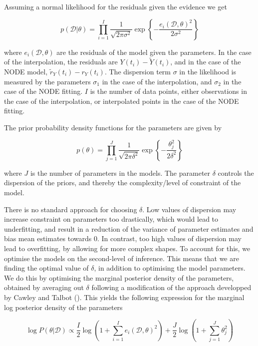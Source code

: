 \documentclass[11pt, oneside]{article}
\begin{document}
Assuming a normal likelihood for the residuals given the evidence we get

\begin{equation}
	p( \mathcal{D} | \theta) = \prod_{i=1}^{I} \frac{1}{\sqrt{2\pi\sigma^2}}  \exp \left\{ -\frac{e_i(\mathcal{D},\theta)^2}{2\sigma^2}  \right\}
\end{equation}

where $e_i(\mathcal{D},\theta)$ are the residuals of the model given the parameters. 
In the case of the interpolation, the residuals are $Y(t_i)-\tilde{Y}(t_i)$, and in the case of the NODE model, $\tilde{r}_{Y}(t_i) - r_{Y}(t_i)$.
The dispersion term $\sigma$ in the likelihood is measured by the parameters $\sigma_1$ in the case of the interpolation, and $\sigma_2$ in the case of the NODE fitting.
$I$ is the number of data points, either observations in the case of the interpolation, or interpolated points in the case of the NODE fitting.

The prior probability density functions for the parameters are given by

\begin{equation}
	p(\theta) = \prod_{j=1}^{J} \frac{1}{\sqrt{2\pi\delta^2}}  \exp \left\{ -\frac{\theta_j^2}{2\delta^2}  \right\}
\end{equation}

where $J$ is the number of parameters in the models.
The parameter $\delta$ controls the dispersion of the priors, and thereby the complexity/level of constraint of the model.

There is no standard approach for choosing $\delta$.
Low values of dispersion may increase constraint on parameters too drastically, which would lead to underfitting, and result in a reduction of the variance of parameter estimates and bias mean estimates towards 0.
In contrast, too high values of dispersion may lead to overfitting, by allowing for more complex shapes.
To account for this, we optimise the models on the second-level of inference.
This means that we are finding the optimal value of $\delta$, in addition to optimising the model parameters. 
We do this by optimising the marginal posterior density of the parameters, obtained by averaging out $\delta$ following a modification of the approach developped by Cawley and Talbot (\cite{Cawley2007}). 
This yields the following expression for the marginal log posterior density of the parameters 

\begin{equation}
	\log P(\theta | \mathcal{D}) \propto \frac{I}{2} \log \left(1 + \sum_{i=1}^{I} e_i(\mathcal{D},\theta)^2\right) + \frac{J}{2} \log \left(1 + \sum_{j=1}^{J} \theta_{j}^2 \right)
\end{equation}
\end{document}
